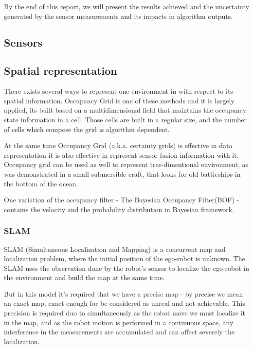 By the end of this report, we will present the results achieved and the uncertainty generated by the sensor measurements and its impacts in algorithm outputs.


\subsection{Sensors}



\subsection{Spatial representation}

There exists several ways to represent one environment in with respect to its spatial information. Occupancy Grid is one of these methods and it is largely applied, its built based on a multidimensional field that maintains the occupancy state information in a cell\cite{Elfes:1989:UOG:68491.68495}. Those cells are built in a regular size, and the number of cells which compose the grid is algorithm dependent. 

At the same time Occupancy Grid (a.k.a. certainty grids) is effective in data representation it is also effective in represent sensor fusion information with it. Occupancy grid can be used as well to represent tree-dimentional environment, as was demonstrated in a small submersible craft, that looks for old battleships in the bottom of the ocean\cite{DBLP:journals/aim/Moravec88}.

One variation of the occupancy filter - The Bayesian Occupancy Filter(BOF) - contains the velocity and the probability distribution in Bayesian framework.


\subsubsection{SLAM}

SLAM (Simultaneous Localization and Mapping) is a concurrent map and localization problem, where the initial position of the ego-robot is unknown. The SLAM uses the observation done by the robot's sensor to localize the ego-robot in the environment and build the map at the same time\cite{VU-2009-454238}. 

But in this model it's required that we have a precise map - by precise we mean an exact map, exact enough for be considered as unreal and not achievable. This precision is required duo to simultaneously as the robot move we must localize it in the map, and as the robot motion is performed in a continuous space, any interference in the measurements are accumulated and can affect severely the localization.

